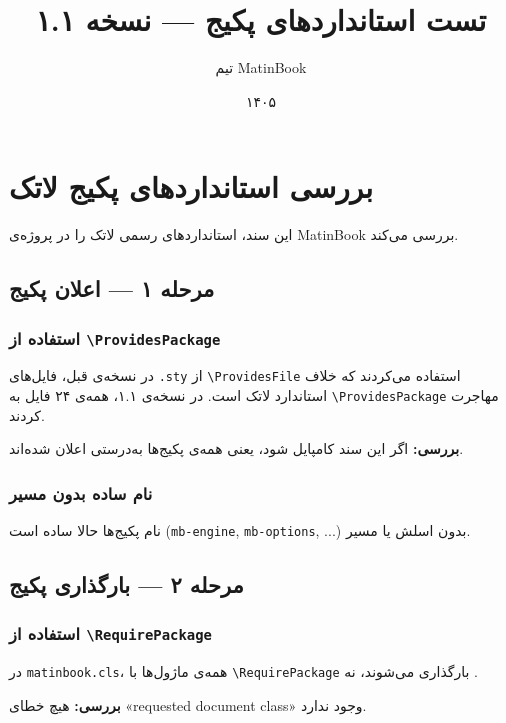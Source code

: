 \documentclass{matinbook}
\title{تست استانداردهای پکیج — نسخه ۱.۱}
\author{تیم MatinBook}
\date{۱۴۰۵}
\begin{document}
\maketitle

\chapter{بررسی استانداردهای پکیج لاتک}
\label{chap:test-packages}

این سند، استانداردهای رسمی لاتک را در پروژه‌ی MatinBook
بررسی می‌کند.

\section{مرحله ۱ — اعلان پکیج}
\label{sec:stage1}

\subsection{استفاده از \texttt{\textbackslash ProvidesPackage}}

در نسخه‌ی قبل، فایل‌های \verb|.sty| از \verb|\ProvidesFile| استفاده
می‌کردند که خلاف استاندارد لاتک است. در نسخه‌ی ۱.۱، همه‌ی ۲۴ فایل
به \verb|\ProvidesPackage| مهاجرت کردند.

\textbf{بررسی:} اگر این سند کامپایل شود، یعنی همه‌ی پکیج‌ها
به‌درستی اعلان شده‌اند.

\subsection{نام ساده بدون مسیر}

نام پکیج‌ها حالا ساده است (\verb|mb-engine|, \verb|mb-options|, ...)
بدون اسلش یا مسیر.

\section{مرحله ۲ — بارگذاری پکیج}
\label{sec:stage2}

\subsection{استفاده از \texttt{\textbackslash RequirePackage}}

در \verb|matinbook.cls|، همه‌ی ماژول‌ها با \verb|\RequirePackage|
بارگذاری می‌شوند، نه \verb||.

\textbf{بررسی:} هیچ خطای «requested document class» وجود ندارد.
\end{document}
